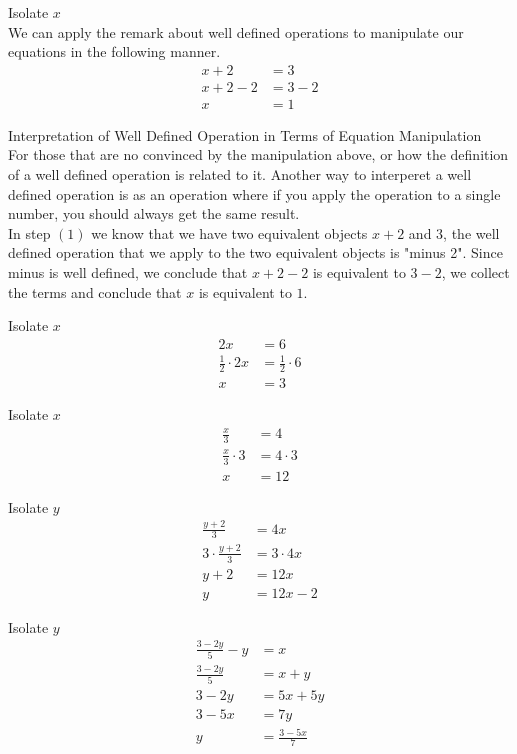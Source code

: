 \documentclass{book}
\begin{document}
  {\example Isolate $x$ \\
    \noindent We can apply the remark about well defined operations to manipulate our equations in the following manner.
    \begin{align}
      x + 2 & = 3\\
      x + 2 - 2 & = 3 - 2\\
      x & = 1
    \end{align}
  }

  {\remark Interpretation of Well Defined Operation in Terms of Equation Manipulation \\
    For those that are no convinced by the manipulation above, or how the definition of a well defined operation is related to it. Another way to interperet a well defined operation is as an operation where if you apply the operation to a single number, you should always get the same result.\\

    \noindent In step $(1)$ we know that we have two equivalent objects $x + 2$ and $3$, the well defined operation that we apply to the two equivalent objects is "minus 2". Since minus is well defined, we conclude that $x + 2 - 2$ is equivalent to $3 - 2$, we collect the terms and conclude that $x$ is equivalent to $1$.
  }

  {\example Isolate $x$ 
    \begin{align*}
      2x & = 6\\
      \frac{1}{2} \cdot 2x & = \frac{1}{2} \cdot 6\\
      x & = 3
    \end{align*}
  }

  {\example Isolate $x$ 
    \begin{align*}
      \frac{x}{3} & = 4\\
      \frac{x}{3} \cdot 3 & = 4 \cdot 3\\
      x & = 12
    \end{align*}
  }

  {\example Isolate $y$ 
    \begin{align*}
      \frac{y + 2}{3} & = 4x\\
      3 \cdot \frac{y + 2}{3} & = 3 \cdot 4x\\
      y + 2 & = 12x\\
      y & = 12x - 2
    \end{align*}
  }

  {\example Isolate $y$ 
    \begin{align*}
      \frac{3 - 2y}{5} - y & = x\\
      \frac{3 - 2y}{5} & = x + y\\
      3 - 2y & = 5x + 5y\\
      3 - 5x & = 7y\\
      y & = \frac{3 - 5x}{7}
    \end{align*}
  }
\end{document}

